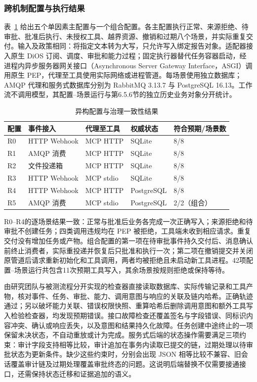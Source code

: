\subsubsection{跨机制配置与执行结果}

表~\ref{tab:heterogeneity-rr022} 给出五个单因素主配置与一个组合配置。各主配置执行正常、来源拒绝、待审批、批准后执行、未授权工具、越界资源、撤销和过期八个场景，并实际重复交付。输入及政策相同：将指定文本转为大写，只允许写入绑定报告对象。适配器接入原生 DiOS 订阅、调度、审批和能力过程；固定执行器替代任务容器启动，经进程内异步服务器网关接口（Asynchronous Server Gateway Interface，ASGI）调用原生 PEP，代理至工具使用实际网络或进程管道。每场景使用独立数据库；AMQP 代理和服务式数据库分别为 RabbitMQ 3.13.7 与 PostgreSQL 16.13。工作流不调用模型，其配置--场景运行与第6.5.6节的独立历史业务对象分开统计。

\begin{table}[htbp]
\centering
\caption{异构配置与治理一致性结果}
\label{tab:heterogeneity-rr022}
\small
\begin{tabular}{lllll}
\toprule
配置 & 事件接入 & 代理至工具 & 权威状态 & 符合预期/场景数 \\
\midrule
R0 & HTTP Webhook & MCP HTTP & SQLite & 8/8 \\
R1 & AMQP 消费 & MCP HTTP & SQLite & 8/8 \\
R2 & 文件投递箱 & MCP HTTP & SQLite & 8/8 \\
R3 & HTTP Webhook & MCP stdio & SQLite & 8/8 \\
R4 & HTTP Webhook & MCP HTTP & PostgreSQL & 8/8 \\
R5 & AMQP 消费 & MCP stdio & PostgreSQL & 2/2（组合） \\
\bottomrule
\end{tabular}
\end{table}

R0--R4的逐场景结果一致：正常与批准后业务各完成一次正确写入；来源拒绝和待审批不创建任务；四类调用违规均在 PEP 被拒绝，工具端未收到相应请求。重复交付没有增加任务或产物。组合配置的第一项在待审批事件持久交付后、消息确认前终止消费者，实际重投递并恢复后只批准和执行一次；第二项在撤销提交并关闭原管道后请求重新初始化和工具调用，两者均被拒绝且未启动新工具进程。42项配置--场景运行共包含11次预期工具写入，其余场景按规则拒绝或保持等待。

由研究团队与被测流程分开实现的检查器直接读取数据库、实际传输记录和工具产物，核对事件、任务、审批、能力、调用意图与响应的关联及链内哈希。正确轨迹通过；另以破坏能力关联、错误权限快照、重算哈希后删除调用意图和额外工具写入检验检查器，均发现预期错误。接口故障检查还覆盖签名与字段错误、同标识内容冲突、确认或响应丢失，以及意图和结果持久化故障。任务创建中途终止的一项保留未决状态，不自动重放或计为完成。服务式后端的状态操作需要满足三项约束：审计字段支持相等比较，审计追加在事务内读取已提交的链，过期处理以待审批状态为更新条件。缺少这些约束时，分别会出现 JSON 相等比较不兼容、旧会话覆盖审计链及过期处理覆盖审批终态的问题。这说明后端替换不仅需要接通接口，还需保持状态迁移和证据追加的语义。

